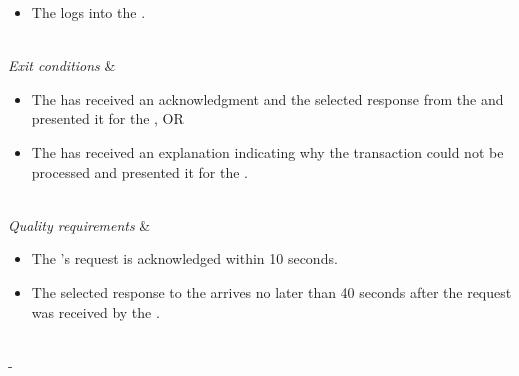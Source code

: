 \begin{table}[H]
\begin{tabu}
\begin{itemize}[leftmargin=*,topsep=0pt,itemsep=-1ex]
		\item The \researcher logs into the \client.
	\end{itemize} \\
	\hline
	\textit{Exit conditions} &
	\vspace{-3mm}
	\begin{itemize}[leftmargin=*,topsep=0pt,itemsep=-1ex]
		\item The \client has received an acknowledgment and the selected response from the \server and presented it for the \researcher, OR
		\item The \client has received an explanation indicating why the transaction could not be processed and presented it for the \researcher.
	\end{itemize} \\
	\hline
	\textit{Quality \newline requirements} &
	\vspace{-3mm}
	\begin{itemize}[leftmargin=*,topsep=0pt,itemsep=-1ex]
		\item The \researcher's request is acknowledged within 10 seconds.
		\item The selected response to the \client arrives no later than 40 seconds after the request was received by the \server.
	\end{itemize} \\
	\tabucline[1.5pt]-
\end{tabu}
\caption{Use case: StoreTaskData}
\label{uc:StoreTaskData}
\end{table}